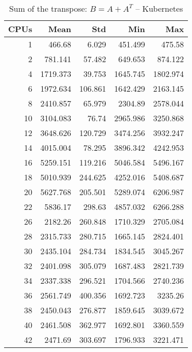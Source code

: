 \begin{table}[htbp]
\begin{minipage}{.45\textwidth}
	\caption{Sum of the transpose: $B=A+A^T$ -- bare metal}
	\label{tab:baremetal-sum-the-transpose}
  \end{minipage}
  \hfill
  \begin{minipage}{.45\textwidth}
    \centering
    \scriptsize
\begin{tabular}{rrrrr}
\toprule
\textbf{CPUs} & \textbf{Mean} & \textbf{Std} & \textbf{Min} & \textbf{Max} \\
\midrule
1 & 466.68 & 6.029 & 451.499 & 475.58 \\
2 & 781.141 & 57.482 & 649.653 & 874.122 \\
4 & 1719.373 & 39.753 & 1645.745 & 1802.974 \\
6 & 1972.634 & 106.861 & 1642.429 & 2163.145 \\
8 & 2410.857 & 65.979 & 2304.89 & 2578.044 \\
10 & 3104.083 & 76.74 & 2965.986 & 3250.868 \\
12 & 3648.626 & 120.729 & 3474.256 & 3932.247 \\
14 & 4015.004 & 78.295 & 3896.342 & 4242.953 \\
16 & 5259.151 & 119.216 & 5046.584 & 5496.167 \\
18 & 5010.939 & 244.625 & 4252.016 & 5408.687 \\
20 & 5627.768 & 205.501 & 5289.074 & 6206.987 \\
22 & 5836.17 & 298.63 & 4857.032 & 6266.288 \\
26 & 2182.26 & 260.848 & 1710.329 & 2705.084 \\
28 & 2315.733 & 280.715 & 1665.145 & 2824.401 \\
30 & 2435.104 & 284.734 & 1834.545 & 3045.267 \\
32 & 2401.098 & 305.079 & 1687.483 & 2821.739 \\
34 & 2337.338 & 296.521 & 1704.566 & 2740.236 \\
36 & 2561.749 & 400.356 & 1692.723 & 3235.26 \\
38 & 2450.043 & 276.877 & 1859.645 & 3039.672 \\
40 & 2461.508 & 362.977 & 1692.801 & 3360.559 \\
42 & 2471.69 & 303.697 & 1796.933 & 3221.471 \\
\bottomrule
\end{tabular}

	\caption{Sum of the transpose: $B=A+A^T$ -- Kubernetes}
	\label{tab:kube-sum-the-transpose}
  \end{minipage}
\end{table}

